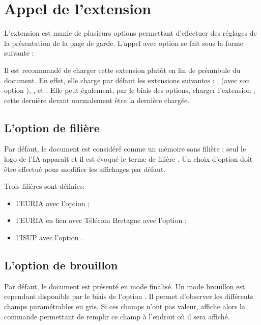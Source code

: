 \section{Appel de l'extension}

L'extension  est munie de plusieurs options permettant d'effectuer des réglages de la présentation de la page de garde. L'appel avec option se fait sous la forme suivante : 
\begin{center}
\end{center}

Il est recommandé de charger cette extension plutôt en fin de préambule du document. En effet, elle charge par défaut les extensions suivantes : ,  (avec son option ), ,  et . Elle peut également, par le biais des options, charger l'extension , cette dernière devant normalement être la dernière chargée.

\subsection{L'option de filière}

Par défaut, le document est considéré comme un mémoire sans filière : seul le logo de l'IA apparaît et il est évoqué le terme de \og filière \fg{}. Un choix d'option doit être effectué pour modifier les affichages par défaut.

Trois filières sont définies: 
\begin{itemize}
\item l'EURIA avec l'option  ;
\item l'EURIA en lien avec Télécom Bretagne avec l'option  ;
\item l'ISUP avec l'option .
\end{itemize}

\subsection{L'option de brouillon}

Par défaut, le document est présenté en mode finalisé. Un mode brouillon est cependant disponible par le biais de l'option . Il permet d'observer les différents champs paramétrables en gris. Si ces champs n'ont pas valeur,  affiche alors la commande permettant de remplir ce champ à l'endroit où il sera affiché.


